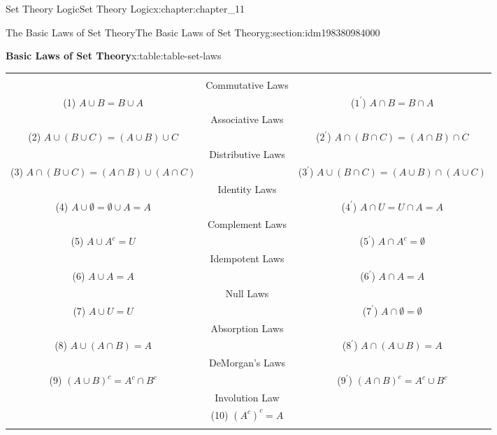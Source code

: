 \documentclass[oneside,10pt,]{book}
\newcommand{\tabularfont}{\relax}
\numberwithin{equation}{section}
\newcommand{\hrulethin}  {\noalign{\hrule height 0.04em}}
\begin{document}
\begin{chapterptx}{Set Theory Logic}{}{Set Theory Logic}{}{}{x:chapter:chapter_11}
\begin{sectionptx}{The Basic Laws of Set Theory}{}{The Basic Laws of Set Theory}{}{}{g:section:idm198380984000}
\begin{tableptx}{\textbf{Basic Laws of Set Theory}}{x:table:table-set-laws}{}%
\centering
{\tabularfont%
\begin{tabular}{ccc}
&&\tabularnewline[0pt]
&Commutative Laws&\tabularnewline[0pt]
(1) \(A \cup B = B \cup  A\)&&(\(1^{\prime}\)) \(A \cap B = B\cap A\)\tabularnewline\hrulethin
&Associative Laws&\tabularnewline[0pt]
(2) \(A \cup  (B \cup  C)= (A\cup B)\cup C\)&&(\(2^{\prime}\)) \(A \cap  (B \cap  C) = (A \cap  B) \cap  C \)\tabularnewline\hrulethin
&Distributive Laws&\tabularnewline[0pt]
(3) \(A\cap (B \cup  C)=(A\cap B )\cup (A\cap  C)\)&&(\(3^{\prime}\)) \(A \cup (B \cap C) = (A \cup B ) \cap (A\cup C)\)\tabularnewline\hrulethin
&Identity Laws&\tabularnewline[0pt]
(4) \(A \cup  \emptyset  = \emptyset  \cup  A = A\)&&(\(4^{\prime}\)) \(A \cap  U = U \cap  A = A\)\tabularnewline\hrulethin
&Complement Laws&\tabularnewline[0pt]
(5) \(A\cup A^c= U\)&&(\(5^{\prime}\)) \(A\cap A^c= \emptyset\)\tabularnewline\hrulethin
&Idempotent Laws&\tabularnewline[0pt]
(6) \(A \cup  A = A\)&&(\(6^{\prime}\)) \(A\cap  A = A\)\tabularnewline\hrulethin
&Null Laws&\tabularnewline[0pt]
(7) \(A \cup  U = U\)&&(\(7^{\prime}\)) \(A \cap  \emptyset  =\emptyset\)\tabularnewline\hrulethin
&Absorption Laws&\tabularnewline[0pt]
(8) \(A \cup  (A\cap  B) = A\)&&(\(8^{\prime}\)) \(A\cap (A \cup  B) = A\)\tabularnewline\hrulethin
&DeMorgan's Laws&\tabularnewline[0pt]
(9) \((A \cup  B)^c= A^c\cap  B^c\)&&(\(9^{\prime}\)) \((A\cap  B)^c = A^c \cup  B^c\)\tabularnewline\hrulethin
&Involution Law&\tabularnewline[0pt]
&(10) \((A^c)^c= A\)&\tabularnewline\hrulethin
\end{tabular}
}%
\end{tableptx}%
\end{sectionptx}
\end{chapterptx}
%
%
\typeout{************************************************}
\typeout{************************************************}
%
\end{document}
